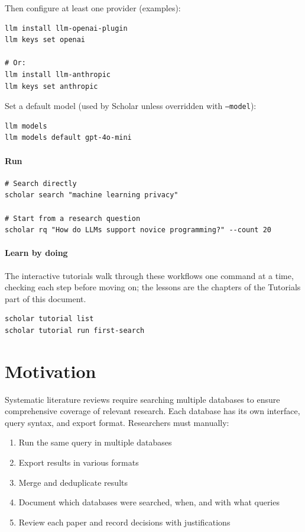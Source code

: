 Then configure at least one provider (examples):
\begin{verbatim}
llm install llm-openai-plugin
llm keys set openai

# Or:
llm install llm-anthropic
llm keys set anthropic
\end{verbatim}

Set a default model (used by Scholar unless overridden with \texttt{--model}):
\begin{verbatim}
llm models
llm models default gpt-4o-mini
\end{verbatim}

\paragraph{Run}
\begin{verbatim}
# Search directly
scholar search "machine learning privacy"

# Start from a research question
scholar rq "How do LLMs support novice programming?" --count 20
\end{verbatim}

\paragraph{Learn by doing}
The interactive tutorials walk through these workflows one command at a
time, checking each step before moving on; the lessons are the chapters of
the Tutorials part of this document.
\begin{verbatim}
scholar tutorial list
scholar tutorial run first-search
\end{verbatim}


\section{Motivation}

Systematic literature reviews require searching multiple databases to ensure 
comprehensive coverage of relevant research.
Each database has its own interface, query syntax, and export format.
Researchers must manually:
\begin{enumerate}
\item Run the same query in multiple databases
\item Export results in various formats
\item Merge and deduplicate results
\item Document which databases were searched, when, and with what queries
\item Review each paper and record decisions with justifications
\end{enumerate}

